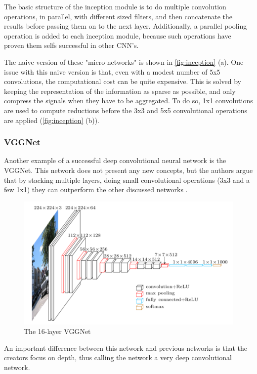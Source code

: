The basic structure of the inception module is to do multiple convolution operations, in parallel, with different sized filters, and then concatenate the results before passing them on to the next layer. Additionally, a parallel pooling operation is added to each inception module, because such operations have proven them selfs successful in other CNN's.

The naive version of these "micro-networks" is shown in \autoref{fig:inception} (a). One issue with this naive version is that, even with a modest number of 5x5 convolutions, the computational cost can be quite expensive. This is solved by keeping the representation of the information as sparse as possible, and only compress the signals when they have to be aggregated. To do so, 1x1 convolutions are used to compute reductions before the 3x3 and 5x5 convolutional operations are applied (\autoref{fig:inception} (b)).

\subsubsection{VGGNet}
Another example of a successful deep convolutional neural network is the VGGNet. This network does not present any new concepts, but the authors argue that by stacking multiple layers, doing small convolutional operations (3x3 and a few 1x1) they can outperform the other discussed networks \citep{Simonyan2014}.

\begin{figure}[!h]
	\centering
	\includegraphics[scale=0.7]{fig/vgg16.png}
	\caption{The 16-layer VGGNet \citep{Frossard2016}}
	\label{fig:inception}
\end{figure}

An important difference between this network and previous networks is that the creators focus on depth, thus calling the network a very deep convolutional network.

